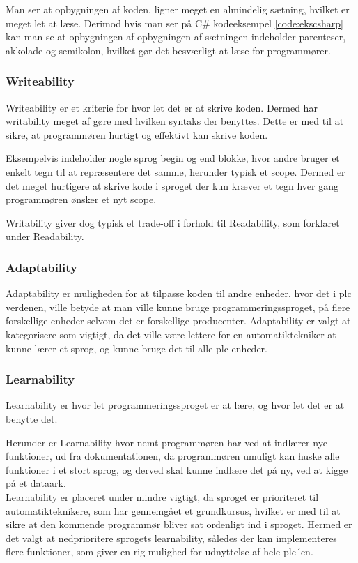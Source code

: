 \noindent Man ser at opbygningen af koden, ligner meget en almindelig sætning, hvilket er meget let at læse. Derimod hvis man ser på C\# kodeeksempel \ref{code:ekscsharp} kan man se at opbygningen af opbygningen af sætningen indeholder parenteser, akkolade og semikolon, hvilket gør det besværligt at læse for programmører.



\subsubsection*{Writeability} Writeability er et kriterie for hvor let det er at skrive koden. Dermed har writability meget af gøre med hvilken syntaks der benyttes. Dette er med til at sikre, at programmøren hurtigt og effektivt kan skrive koden.

Eksempelvis indeholder nogle sprog begin og end blokke, hvor andre bruger et enkelt tegn til at repræsentere det samme, herunder typisk et scope. Dermed er det meget hurtigere at skrive kode i sproget der kun kræver et tegn hver gang programmøren ønsker et nyt scope.

Writability giver dog typisk et trade-off i forhold til Readability, som forklaret under Readability.\\

\subsubsection*{Adaptability} Adaptability er muligheden for at tilpasse koden til andre enheder, hvor det i \gls{plc} verdenen, ville betyde at man ville kunne bruge programmeringssproget, på flere forskellige enheder selvom det er forskellige producenter. Adaptability er valgt at kategorisere som vigtigt, da det ville være lettere for en automatiktekniker at kunne lærer et sprog, og kunne bruge det til alle \gls{plc} enheder.

\subsubsection*{Learnability} Learnability er hvor let programmeringssproget er at lære, og hvor let det er at benytte det.

Herunder er Learnability hvor nemt programmøren har ved at indlærer nye funktioner, ud fra dokumentationen, da programmøren umuligt kan huske alle funktioner i et stort sprog, og derved skal kunne indlære det på ny, ved at kigge på et dataark. \\
Learnability er placeret under mindre vigtigt, da sproget er prioriteret til automatikteknikere, som har gennemgået et grundkursus, hvilket er med til at sikre at den kommende programmør bliver sat ordenligt ind i sproget. Hermed er det valgt at nedprioritere sprogets learnability, således der kan implementeres flere funktioner, som giver en rig mulighed for udnyttelse af hele \gls{plc}´en.\\

